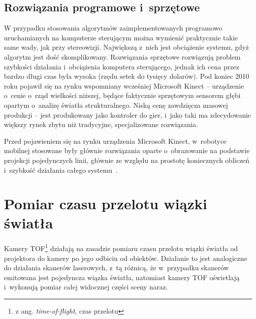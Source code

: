 \subsection{Rozwiązania programowe i~sprzętowe}

W przypadku stosowania algorytmów zaimplementowanych programowo uruchamianych na
komputerze sterującym można wymienić praktycznie takie same wady, jak przy
stereowizji. Największą z~nich jest obciążenie systemu, gdyż algorytm jest
dość skomplikowany. Rozwiązania sprzętowe rozwiązują problem szybkości działania
i~obciążenia komputera sterującego, jednak ich cena przez bardzo długi czas
była wysoka (rzędu setek do tysięcy dolarów). Pod koniec 2010 roku pojawił się
na rynku wspomniany wcześniej Microsoft Kinect -- urządzenie o~cenie
o~rząd wielkości niższej, będące faktycznie sprzętowym sensorem głębi opartym
o~analizę światła strukturalnego. Niską cenę zawdzięcza masowej produkcji -- jest
produkowany jako kontroler do gier, i~jako taki ma zdecydowanie większy rynek
zbytu niż tradycyjne, specjalizowane rozwiązania.

Przed pojawieniem się na rynku urządzenia Microsoft Kinect, w~robotyce mobilnej
stosowane były głównie rozwiązania oparte o~obrazowanie na podstawie projekcji
pojedynczych linii, głównie ze względu na prostotę
koniecznych obliczeń i~szybkość działania całego systemu~\cite{120445,5246792}.


\section{Pomiar czasu przelotu wiązki światła}

Kamery TOF\footnote{z ang. {\it time-of-flight}, czas przelotu} działają na zasadzie
pomiaru czasu przelotu wiązki światła od projektora do kamery po jego odbiciu od
obiektów. Działanie to jest analogiczne do działania skanerów laserowych, z~tą różnicą,
że w~przypadku skanerów emitowana jest pojedyncza wiązka światła, natomiast kamery TOF
oświetlają i~wykonują pomiar całej widocznej części sceny naraz.


